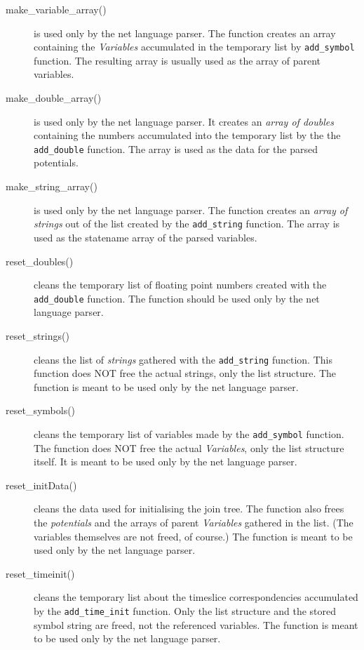 \documentclass[12pt,a4paper]{report}
\newcommand{\cdatatype}[1]{{\it #1}}
\newcommand{\cfunction}[1]{\texttt{#1}}
\begin{document}
\begin{description}
\item[make\_variable\_array()] is used only by the net language
parser. The function creates an array containing the \cdatatype{Variables}
accumulated in the temporary list by \cfunction{add\_symbol}
function. The resulting array is usually used as the array of parent 
variables.

\item[make\_double\_array()] is used only by the net language
parser. It creates an \cdatatype{array of doubles} containing the numbers
accumulated into the temporary list by the the \cfunction{add\_double}
function. The array is used as the data for the parsed potentials. 

\item[make\_string\_array()] is used only by the net language
parser. The function creates an \cdatatype{array of strings} out of the list
created by the \cfunction{add\_string} function. The array is used as the
statename array of the parsed variables.

\item[reset\_doubles()] cleans the temporary list of floating point
numbers created with the \cfunction{add\_double} function. The function
should be used only by the net language parser.

\item[reset\_strings()] cleans the list of \cdatatype{strings} gathered with
the \cfunction{add\_string} function. This function does NOT free the
actual strings, only the list structure. The function is meant to be
used only by the net language parser.

\item[reset\_symbols()] cleans the temporary list of variables made by
the \cfunction{add\_symbol} function. The function does NOT free the
actual \cdatatype{Variables}, only the list structure itself. It is meant to
be used only by the net language parser.

\item[reset\_initData()] cleans the data used for initialising the
join tree. The function also frees the \cdatatype{potentials} and the arrays of
parent \cdatatype{Variables} gathered in the list. (The variables themselves
are not freed, of course.) The function is meant to be used only by
the net language parser.

\item[reset\_timeinit()] cleans the temporary list about the timeslice
correspondencies accumulated by the \cfunction{add\_time\_init} function.
Only the list structure and the stored symbol string are freed, not
the referenced variables. The function is meant to be used only by the
net language parser.


\end{description}
\end{document}
